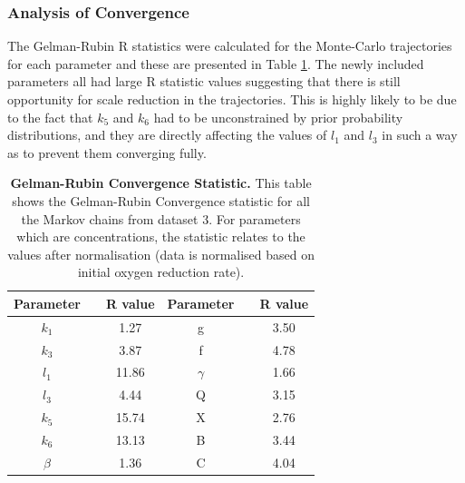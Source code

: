 \subsubsection{Analysis of Convergence}
The Gelman-Rubin R statistics were calculated for the Monte-Carlo trajectories for each parameter and these are presented in Table \ref{tab:noRstat}. The newly included parameters all had large R statistic values suggesting that there is still opportunity for scale reduction in the trajectories. This is highly likely to be due to the fact that $k_5$ and $k_6$ had to be unconstrained by prior probability distributions, and they are directly affecting the values of $l_1$ and $l_3$ in such a way as to prevent them converging fully.

\begin{table}[tbp]%
\renewcommand{\arraystretch}{1.5}
\begin{center}
\begin{tabular}{ccc|ccc}
\toprule
\textbf{Parameter} && \textbf{R value} & \textbf{Parameter} && \textbf{R value}\\
\midrule
$k_1$ && 1.27 & g && 3.50\\
$k_3$ && 3.87 & f && 4.78\\
$l_1$ && 11.86 & $\gamma$ && 1.66\\
$l_3$ && 4.44 & Q && 3.15\\
$k_5$ && 15.74 & X && 2.76\\
$k_6$ && 13.13 & B && 3.44\\
$\beta$ && 1.36 & C && 4.04 \\
\bottomrule
\end{tabular}
\end{center}
\caption[Gelman-Rubin Convergence Statistic]{{\bf Gelman-Rubin Convergence Statistic.} This table shows the Gelman-Rubin Convergence statistic for all the Markov chains from dataset 3. For parameters which are concentrations, the statistic relates to the values after normalisation (data is normalised based on initial oxygen reduction rate).
\label{tab:noRstat}}
\end{table}

